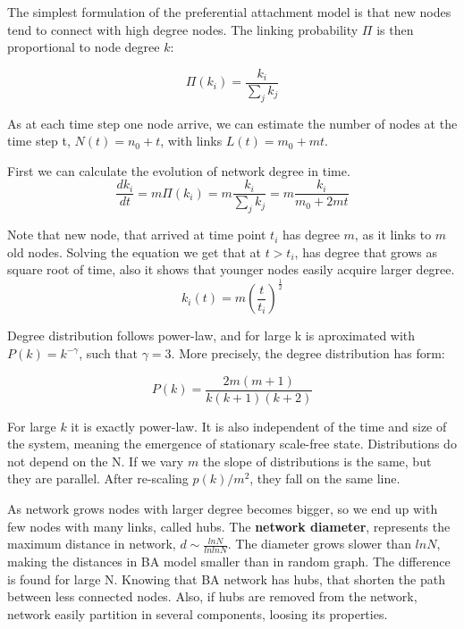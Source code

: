 The simplest formulation of the preferential attachment model is that new nodes tend to connect with high degree nodes. The linking probability $\Pi$ is then proportional to node degree $k$:  

\begin{equation}
\Pi(k_i) = \frac{k_i}{\sum_jk_j} 
\end{equation} 

As at each time step one node arrive, we can estimate the number of nodes at the time step t, $N(t) = n_0+t$, with links $L(t) =m_0+ mt$. 

First we can calculate the evolution of network degree in time.
\begin{equation}
\frac{dk_i}{dt} = m\Pi(k_i) = m\frac{k_i}{\sum_jk_j} = m\frac{k_i}{m_0 + 2mt}
\end{equation}

Note that new node, that arrived at time point $t_i$ has degree $m$, as it links to $m$ old nodes. Solving the equation we get that at $t>t_i$, has degree that grows as square root of time, also it shows that younger nodes easily acquire larger degree. 
\begin{equation}
k_i(t) = m \left(\frac{t}{t_i}\right)^{\frac{1}{2}}
\end{equation}


Degree distribution follows power-law, and for large k is aproximated with $P(k) = k^{-\gamma}$, such that $\gamma=3$. More precisely, the degree distribution has form:

\begin{equation}
P(k) = \frac{2m(m+1)}{k(k+1)(k+2)}
\end{equation}

For large $k$ it is exactly power-law. It is also independent of the time and size of the system, meaning the emergence of stationary scale-free state. Distributions do not depend on the N. If we vary $m$ the slope of distributions is the same, but they are parallel. After re-scaling $p(k)/m^2$, they fall on the same line. 




As network grows nodes with larger degree becomes bigger, so we end up with few nodes with many links, called hubs. The \textbf{network diameter}, represents the maximum distance in network, $d \sim \frac{lnN}{lnlnN}$. The diameter grows slower than $lnN$, making the distances in BA model smaller than in random graph. The difference is found for large N. Knowing that BA network has hubs, that shorten the path between less connected nodes. Also, if hubs are removed from the network, network easily partition in several components, loosing its  properties. 

